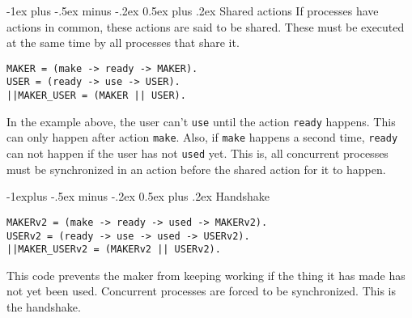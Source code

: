 \documentclass[10pt,landscape]{article}
\makeatletter
\renewcommand{\section}{\@startsection{section}{1}{0mm}%
                                {-1ex plus -.5ex minus -.2ex}%
                                {0.5ex plus .2ex}%
                                {\normalfont\large\bfseries}}
\renewcommand{\subsection}{\@startsection{subsection}{2}{0mm}%
                                {-1explus -.5ex minus -.2ex}%
                                {0.5ex plus .2ex}%
                                {\normalfont\normalsize\bfseries}}
\makeatother
\begin{document}
\begin{multicols}{3}
\section{Shared actions}
If processes have actions in common, these actions are said to be shared. These must be executed at the same time by all processes that share it.
\begin{verbatim}
MAKER = (make -> ready -> MAKER).
USER = (ready -> use -> USER).
||MAKER_USER = (MAKER || USER).
\end{verbatim}
In the example above, the user can't \texttt{use} until the action \texttt{ready} happens. This can only happen after action \texttt{make}. Also, if \texttt{make} happens a second time, \texttt{ready} can not happen if the user has not \texttt{used} yet. This is, all concurrent processes must be synchronized in an action before the shared action for it to happen.
\begin{center}
\end{center}
\subsection{Handshake}
\begin{verbatim}
MAKERv2 = (make -> ready -> used -> MAKERv2).
USERv2 = (ready -> use -> used -> USERv2).
||MAKER_USERv2 = (MAKERv2 || USERv2).
\end{verbatim}
This code prevents the maker from keeping working if the thing it has made has not yet been used. Concurrent processes are forced to be synchronized. This is the handshake.
\begin{center}
\end{center}

\end{multicols}
\end{document}
